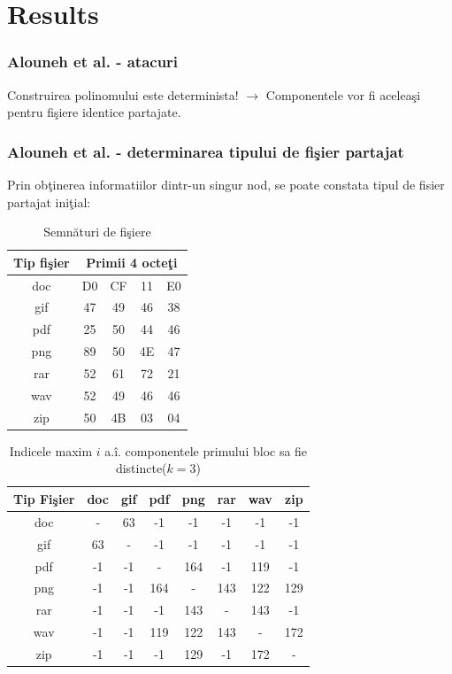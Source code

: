 \documentclass{beamer}
\theoremstyle{definition}
\begin{document}
\section{Results}
\begin{frame}
    \frametitle{Alouneh et al. - atacuri}
    Construirea polinomului este determinista! $\rightarrow$ Componentele vor fi acelea\c{s}i pentru fi\c{s}iere identice partajate.
\end{frame}
\begin{frame}
    \frametitle{Alouneh et al. - determinarea tipului de fi\c{s}ier partajat}
    Prin ob\c{t}inerea informatiilor dintr-un singur nod, se poate constata tipul de fisier partajat ini\c{t}ial:
     {
        \begin{table}[b]
        \bigskip
        \begin{center}
        \caption{Semn\u{a}turi de fi\c{s}iere}\label{tb:margins}
        \label{table:sign}
            \begin{tabular}{ccccc}
            Tip fi\c{s}ier &  \multicolumn{4}{c}{Primii 4 octe\c{t}i}\\ \hline 
            doc &  D0 & CF & 11 & E0\\
            gif & 47 & 49 & 46 & 38 \\
            pdf & 25 & 50 & 44 & 46 \\
            png & 89 & 50 & 4E & 47 \\
            rar & 52 & 61 & 72 & 21 \\
            wav & 52 & 49 & 46 & 46 \\
            zip & 50 & 4B & 03 & 04\\  \hline
            \end{tabular}
        \end{center}
        \bigskip
        \end{table}
    }
     {
    \begin{table}[t]
        \begin{center}
        \caption{Indicele maxim $i$ a.\^{i}. componentele primului bloc sa fie distincte($k=3$)}\label{tb:margins}
        \label{table:k3}
        \begin{tabular}{cccccccc}
        Tip Fi\c{s}ier & doc & gif & pdf & png & rar & wav & zip \\\hline
          doc & - & 63 & -1 & -1 & -1 & -1 & -1\\
          gif & 63 & - & -1 & -1 & -1 & -1 & -1\\
          pdf & -1 & -1 & - & 164 & -1 & 119 & -1\\
          png & -1 & -1 & 164 & - & 143 & 122 & 129\\
          rar & -1 & -1 & -1 & 143 & - & 143 & -1\\
          wav & -1 & -1 & 119 & 122 & 143 & - & 172\\
          zip & -1 & -1 & -1 & 129 & -1 & 172 & -\\ \hline
        \end{tabular}
        \end{center}
        \bigskip
    \end{table}
    }
\end{frame}
\end{document}
